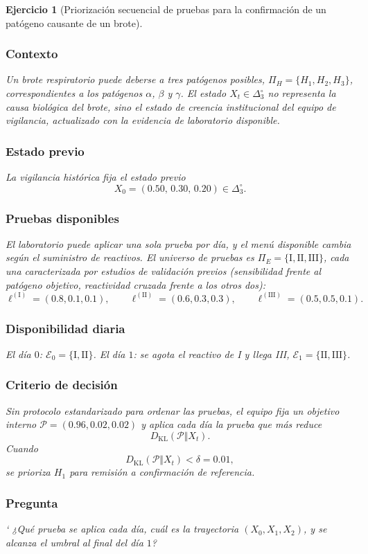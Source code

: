 \documentclass[12pt]{article}
\newtheorem{ejercicio}{Ejercicio}[section]
\begin{document}
\begin{ejercicio}[Priorización secuencial de pruebas para la confirmación de un patógeno causante de un brote]\label{ej:validacion_patogeno}
\subsubsection*{Contexto}
Un brote respiratorio puede deberse a tres patógenos posibles, $\Pi_H=\{H_1,H_2,H_3\}$, correspondientes a los patógenos $\alpha$, $\beta$ y $\gamma$. El estado $X_t\in\Delta_3^\circ$ no representa la causa biológica del brote, sino el estado de creencia institucional del equipo de vigilancia, actualizado con la evidencia de laboratorio disponible.

\subsubsection*{Estado previo}
La vigilancia histórica fija el estado previo
\[
X_0=(0.50,\,0.30,\,0.20)\in\Delta_3^\circ.
\]

\subsubsection*{Pruebas disponibles}
El laboratorio puede aplicar una sola prueba por día, y el menú disponible cambia según el suministro de reactivos. El universo de pruebas es $\Pi_E=\{\mathrm{I,II,III}\}$, cada una caracterizada por estudios de validación previos (sensibilidad frente al patógeno objetivo, reactividad cruzada frente a los otros dos):
\[
\ell^{(\mathrm I)}=(0.8,0.1,0.1),\qquad
\ell^{(\mathrm{II})}=(0.6,0.3,0.3),\qquad
\ell^{(\mathrm{III})}=(0.5,0.5,0.1).
\]

\subsubsection*{Disponibilidad diaria}
El día $0$: $\mathcal E_0=\{\mathrm I,\mathrm{II}\}$. El día $1$: se agota el reactivo de I y llega III, $\mathcal E_1=\{\mathrm{II},\mathrm{III}\}$.

\subsubsection*{Criterio de decisión}
Sin protocolo estandarizado para ordenar las pruebas, el equipo fija un objetivo interno $\mathcal P=(0.96,0.02,0.02)$ y aplica cada día la prueba que más reduce
\[
D_{\mathrm{KL}}(\mathcal P\Vert X_t).
\]
Cuando
\[
D_{\mathrm{KL}}(\mathcal P\Vert X_t)<\delta=0.01,
\]
se prioriza $H_1$ para remisión a confirmación de referencia.

\subsubsection*{Pregunta}
‘ ¿Qué prueba se aplica cada día, cuál es la trayectoria $(X_0,X_1,X_2)$, y se alcanza el umbral al final del día $1$?
\end{ejercicio}
\end{document}
